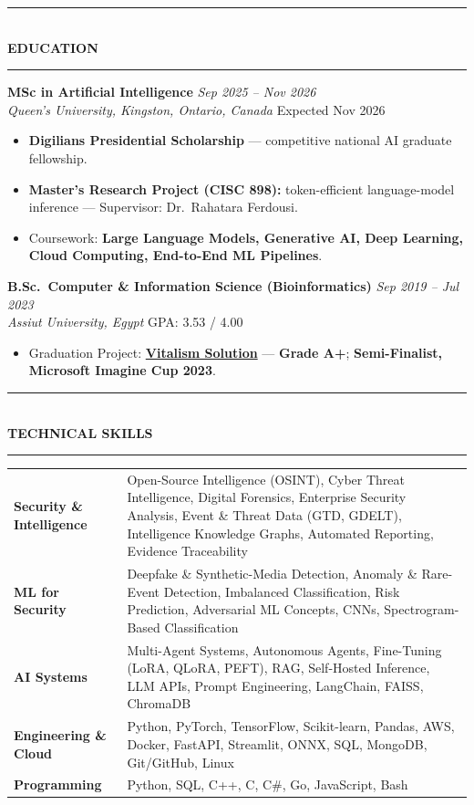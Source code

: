 \documentclass[10pt, a4paper]{article}
\newcommand{\cvsection}[1]{%
  \vspace{3pt}%
  {\color{navy}\rule{\linewidth}{1.1pt}}\\[0.5pt]%
  {\color{navy}\bfseries\fontsize{9.5}{11}\selectfont\uppercase{#1}}\\[-4pt]%
  {\color{teal}\rule{\linewidth}{0.6pt}}%
  \vspace{2pt}%
}
\newcommand{\cventry}[4]{%
  \vspace{2.5pt}%
  \textbf{\color{darkgray}#1} \hfill {\color{midgray}\textit{#3}}\\[-1.5pt]%
  {\color{teal}\textit{#2}} \hfill {\color{midgray}#4}%
}
\newenvironment{cvitems}{%
  \begin{itemize}[leftmargin=11pt, itemsep=0.5pt, parsep=0pt, topsep=1pt,
                  label={\textcolor{teal}{$\bullet$}}]
}{%
  \end{itemize}%
}
\begin{document}
\cvsection{Education}

\cventry{MSc in Artificial Intelligence}{Queen's University, Kingston, Ontario, Canada}
        {Sep 2025 -- Nov 2026}{Expected Nov 2026}
\begin{cvitems}
  \item \textbf{Digilians Presidential Scholarship} --- competitive national AI graduate fellowship.
  \item \textbf{Master's Research Project (CISC 898):} token-efficient language-model inference --- Supervisor: Dr.\ Rahatara Ferdousi.
  \item Coursework: \textbf{Large Language Models, Generative AI, Deep Learning, Cloud Computing, End-to-End ML Pipelines}.
\end{cvitems}

\cventry{B.Sc.\ Computer \& Information Science (Bioinformatics)}{Assiut University, Egypt}
        {Sep 2019 -- Jul 2023}{GPA: 3.53 / 4.00}
\begin{cvitems}
  \item Graduation Project: \href{https://vitalismsolution.github.io/}{\textbf{Vitalism Solution}} --- \textbf{Grade A+}; \textbf{Semi-Finalist, Microsoft Imagine Cup 2023}.
\end{cvitems}

\cvsection{Technical Skills}

\renewcommand{\arraystretch}{1.1}
\begin{tabularx}{\linewidth}{@{}>{\raggedright\hyphenpenalty=10000\arraybackslash}p{35mm} X@{}}
\textbf{Security \& Intelligence} &
Open-Source Intelligence (OSINT), Cyber Threat Intelligence, Digital Forensics, Enterprise Security Analysis, Event \& Threat Data (GTD, GDELT), Intelligence Knowledge Graphs, Automated Reporting, Evidence Traceability \\

\textbf{ML for Security} &
Deepfake \& Synthetic-Media Detection, Anomaly \& Rare-Event Detection, Imbalanced Classification, Risk Prediction, Adversarial ML Concepts, CNNs, Spectrogram-Based Classification \\

\textbf{AI Systems} &
Multi-Agent Systems, Autonomous Agents, Fine-Tuning (LoRA, QLoRA, PEFT), RAG, Self-Hosted Inference, LLM APIs, Prompt Engineering, LangChain, FAISS, ChromaDB \\

\textbf{Engineering \& Cloud} &
Python, PyTorch, TensorFlow, Scikit-learn, Pandas, AWS, Docker, FastAPI, Streamlit, ONNX, SQL, MongoDB, Git/GitHub, Linux \\

\textbf{Programming} &
Python, SQL, C++, C, C\#, Go, JavaScript, Bash \\
\end{tabularx}
\end{document}
